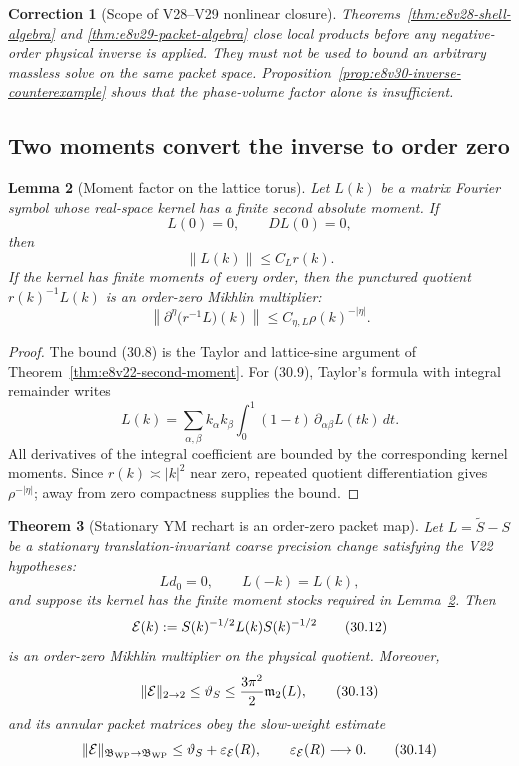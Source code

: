\documentclass[11pt,oneside]{book}
\newtheorem{theorem}{Theorem}[chapter]
\newtheorem{lemma}[theorem]{Lemma}
\newtheorem{correction}[theorem]{Correction}
\theoremstyle{definition}
\theoremstyle{remark}
\begin{document}
\begin{correction}[Scope of V28--V29 nonlinear closure]
\label{corr:e8v30-paraproduct-scope}
Theorems~\ref{thm:e8v28-shell-algebra} and
\ref{thm:e8v29-packet-algebra} close local products before any
negative-order physical inverse is applied.  They must not be used to
bound an arbitrary massless solve on the same packet space.
Proposition~\ref{prop:e8v30-inverse-counterexample} shows that the
phase-volume factor alone is insufficient.
\end{correction}

\subsection{Two moments convert the inverse to order zero}

\begin{lemma}[Moment factor on the lattice torus]
\label{lem:e8v30-moment-factor}
Let \(L(k)\) be a matrix Fourier symbol whose real-space kernel has a
finite second absolute moment.  If
\[
                         L(0)=0,\qquad DL(0)=0,                   \tag{30.7}
\]
then
\[
                         \|L(k)\|\leq C_L r(k).                   \tag{30.8}
\]
If the kernel has finite moments of every order, then the punctured
quotient \(r(k)^{-1}L(k)\) is an order-zero Mikhlin multiplier:
\[
 \left\|\partial^\eta\bigl(r^{-1}L\bigr)(k)\right\|
 \leq C_{\eta,L}\rho(k)^{-|\eta|}.                               \tag{30.9}
\]
\end{lemma}

\begin{proof}
The bound (30.8) is the Taylor and lattice-sine argument of
Theorem~\ref{thm:e8v22-second-moment}.  For (30.9), Taylor's formula
with integral remainder writes
\[
 L(k)=\sum_{\alpha,\beta}k_\alpha k_\beta
 \int_0^1(1-t)\,
 \partial_{\alpha\beta}L(tk)\,dt.                                \tag{30.10}
\]
All derivatives of the integral coefficient are bounded by the
corresponding kernel moments.  Since \(r(k)\asymp|k|^2\) near zero,
repeated quotient differentiation gives
\(\rho^{-|\eta|}\); away from zero compactness supplies the bound.
\end{proof}

\begin{theorem}[Stationary YM rechart is an order-zero packet map]
\label{thm:e8v30-stationary-rechart}
Let \(L=\widetilde S-S\) be a stationary translation-invariant coarse
precision change satisfying the V22 hypotheses:
\[
 Ld_0=0,\qquad L(-k)=L(k),                                       \tag{30.11}
\]
and suppose its kernel has the finite moment stocks required in
Lemma~\ref{lem:e8v30-moment-factor}.  Then
\[
 {\cal E}(k):=S(k)^{-1/2}L(k)S(k)^{-1/2}                         \tag{30.12}
\]
is an order-zero Mikhlin multiplier on the physical quotient.
Moreover,
\[
                         \|{\cal E}\|_{2\to2}
 \leq\vartheta_S
 \leq\frac{3\pi^2}{2}\mathfrak m_2(L),                           \tag{30.13}
\]
and its annular packet matrices obey the slow-weight estimate
\[
 \|{\cal E}\|_{\mathfrak B_{\rm WP}\to\mathfrak B_{\rm WP}}
 \leq\vartheta_S+\varepsilon_{\cal E}(R),\qquad
 \varepsilon_{\cal E}(R)\longrightarrow0.                       \tag{30.14}
\]
\end{theorem}
\end{document}
